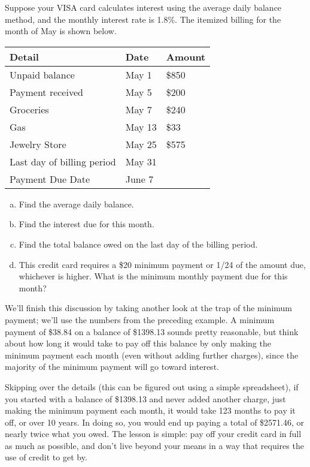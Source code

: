 \begin{try}
Suppose your VISA card calculates interest using the average daily balance method, and the monthly interest rate is 1.8\%.  The itemized billing for the month of May is shown below.
\begin{center}
\begin{tabular}{l l l}
Detail & Date & Amount\\
\hline
Unpaid balance & May 1 & \$850\\
Payment received & May 5 & \$200\\
Groceries & May 7 & \$240\\
Gas & May 13 & \$33\\
Jewelry Store & May 25 & \$575\\
Last day of billing period & May 31 &\\
Payment Due Date & June 7 &\\
\end{tabular}
\end{center}

\begin{enumerate}[(a)]
\item Find the average daily balance.
\item Find the interest due for this month.
\item Find the total balance owed on the last day of the billing period.
\item This credit card requires a \$20 minimum payment or 1/24 of the amount due, whichever is higher.  What is the minimum monthly payment due for this month?
\end{enumerate}
\end{try}

We'll finish this discussion by taking another look at the trap of the minimum payment; we'll use the numbers from the preceding example.  A minimum payment of \$38.84 on a balance of \$1398.13 sounds pretty reasonable, but think about how long it would take to pay off this balance by only making the minimum payment each month (even without adding further charges), since the majority of the minimum payment will go toward interest.

Skipping over the details (this can be figured out using a simple spreadsheet), if you started with a balance of \$1398.13 and never added another charge, just making the minimum payment each month, it would take 123 months to pay it off, or over 10 years.  In doing so, you would end up paying a total of \$2571.46, or nearly twice what you owed.  The lesson is simple: pay off your credit card in full as much as possible, and don't live beyond your means in a way that requires the use of credit to get by.

